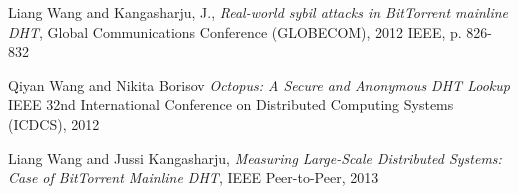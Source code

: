 \begin{thebibliography}{99}
  Liang Wang and Kangasharju, J.,
  \textit{Real-world sybil attacks in BitTorrent mainline DHT},
  Global Communications Conference (GLOBECOM), 2012 IEEE, p. 826-832

   Qiyan Wang and Nikita Borisov
   \textit{Octopus: A Secure and Anonymous DHT Lookup}
   IEEE 32nd International Conference on Distributed Computing Systems (ICDCS), 2012

  Liang Wang and Jussi Kangasharju,
  \textit{Measuring Large-Scale Distributed Systems: Case of BitTorrent
  Mainline DHT}, 
  IEEE Peer-to-Peer, 2013


\end{thebibliography}


